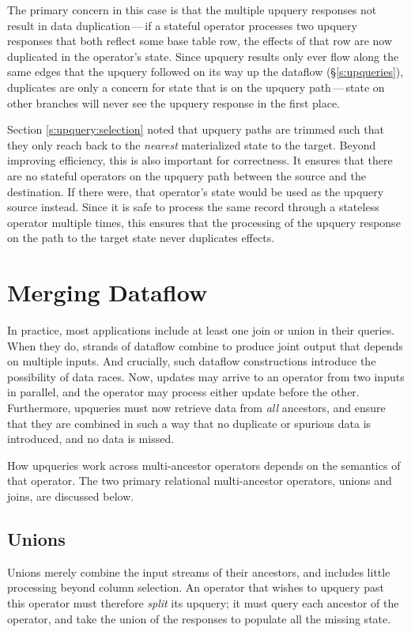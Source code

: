 The primary concern in this case is that the multiple upquery responses not
result in data duplication\,---\,if a stateful operator processes two upquery
responses that both reflect some base table row, the effects of that row are now
duplicated in the operator's state. Since upquery results only ever flow along
the same edges that the upquery followed on its way up the dataflow
(\S\ref{s:upqueries}), duplicates are only a concern for state that is on the
upquery path\,---\,state on other branches will never see the upquery response
in the first place.

Section \ref{s:upquery:selection} noted that upquery paths are trimmed such that
they only reach back to the \emph{nearest} materialized state to the target.
Beyond improving efficiency, this is also important for correctness. It ensures
that there are no stateful operators on the upquery path between the source and
the destination. If there were, that operator's state would be used as the
upquery source instead. Since it is safe to process the same record through a
stateless operator multiple times, this ensures that the processing of the
upquery response on the path to the target state never duplicates effects.

\section{Merging Dataflow}

In practice, most applications include at least one join or union in their
queries. When they do, strands of dataflow combine to produce joint output that
depends on multiple inputs. And crucially, such dataflow constructions introduce
the possibility of data races. Now, updates may arrive to an operator from two
inputs in parallel, and the operator may process either update before the other.
Furthermore, upqueries must now retrieve data from \emph{all} ancestors, and
ensure that they are combined in such a way that no duplicate or spurious data
is introduced, and no data is missed.

How upqueries work across multi-ancestor operators depends on the semantics of
that operator. The two primary relational multi-ancestor operators, unions and
joins, are discussed below.

\subsection{Unions}
\label{s:upqueries:union}

Unions merely combine the input streams of their ancestors, and includes little
processing beyond column selection. An operator that wishes to upquery past this
operator must therefore \emph{split} its upquery; it must query each ancestor of
the operator, and take the union of the responses to populate all the missing
state.

